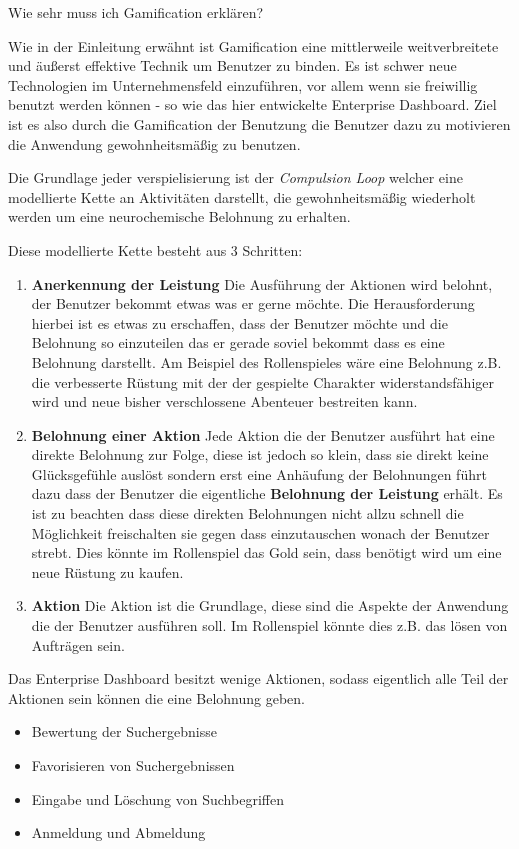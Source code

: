 \documentclass[12pt,twoside]{book}
\begin{document}
Wie sehr muss ich Gamification erklären?

Wie in der Einleitung erwähnt ist Gamification eine mittlerweile weitverbreitete und äußerst effektive Technik um Benutzer zu binden. Es ist schwer neue Technologien im Unternehmensfeld einzuführen, vor allem wenn sie freiwillig benutzt werden können - so wie das hier entwickelte Enterprise Dashboard. Ziel ist es also durch die Gamification der Benutzung die Benutzer dazu zu motivieren die Anwendung gewohnheitsmäßig zu benutzen.

Die Grundlage jeder verspielisierung ist der \textit{Compulsion Loop} welcher eine modellierte Kette an Aktivitäten darstellt, die gewohnheitsmäßig wiederholt werden um eine neurochemische Belohnung zu erhalten.

Diese modellierte Kette besteht aus 3 Schritten:

\begin{enumerate}
  \item \textbf{Anerkennung der Leistung} Die Ausführung der Aktionen wird belohnt, der Benutzer bekommt etwas was er gerne möchte. Die Herausforderung hierbei ist es etwas zu erschaffen, dass der Benutzer möchte und die Belohnung so einzuteilen das er gerade soviel bekommt dass es eine Belohnung darstellt. Am Beispiel des Rollenspieles wäre eine Belohnung z.B. die verbesserte Rüstung mit der der gespielte Charakter widerstandsfähiger wird und neue bisher verschlossene Abenteuer bestreiten kann.
  \item \textbf{Belohnung einer Aktion} Jede Aktion die der Benutzer ausführt hat eine direkte Belohnung zur Folge, diese ist jedoch so klein, dass sie direkt keine Glücksgefühle auslöst sondern erst eine Anhäufung der Belohnungen führt dazu dass der Benutzer die eigentliche \textbf{Belohnung der Leistung} erhält. Es ist zu beachten dass diese direkten Belohnungen nicht allzu schnell die Möglichkeit freischalten sie gegen dass einzutauschen wonach der Benutzer strebt. Dies könnte im Rollenspiel das Gold sein, dass benötigt wird um eine neue Rüstung zu kaufen.
  \item \textbf{Aktion} Die Aktion ist die Grundlage, diese sind die Aspekte der Anwendung die der Benutzer ausführen soll. Im Rollenspiel könnte dies z.B. das lösen von Aufträgen sein.
\end{enumerate}


Das Enterprise Dashboard besitzt wenige Aktionen, sodass eigentlich alle Teil der Aktionen sein können die eine Belohnung geben.

\begin{itemize}
  \item Bewertung der Suchergebnisse
  \item Favorisieren von Suchergebnissen
  \item Eingabe und Löschung von Suchbegriffen
  \item Anmeldung und Abmeldung
\end{itemize}
\end{document}
